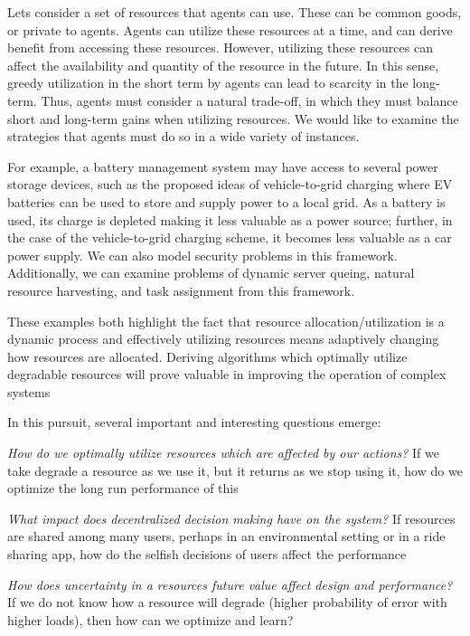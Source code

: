 \documentclass[letterpaper, 10 pt, conference]{ieeeconf}
\begin{document}
Lets consider a set of resources that agents can use. These can be common goods, or private to agents. Agents can utilize these resources at a time, and can derive benefit from accessing these resources. However, utilizing these resources can affect the availability and quantity of the resource in the future. In this sense, greedy utilization in the short term by agents can lead to scarcity in the long-term. Thus, agents must consider a natural trade-off, in which they must balance short and long-term gains when utilizing resources. We would like to examine the strategies that agents must do so in a wide variety of instances.

For example, a battery management system may have access to several power storage devices, such as the proposed ideas of vehicle-to-grid charging where EV batteries can be used to store and supply power to a local grid. As a battery is used, its charge is depleted making it less valuable as a power source; further, in the case of the vehicle-to-grid charging scheme, it becomes less valuable as a car power supply. We can also model security problems in this framework.  Additionally, we can examine problems of dynamic server queing, natural resource harvesting, and task assignment from this framework.

These examples both highlight the fact that resource allocation/utilization is a dynamic process and effectively utilizing resources means adaptively changing how resources are allocated. Deriving algorithms which optimally utilize degradable resources will prove valuable in improving the operation of complex systems

In this pursuit, several important  and interesting questions emerge:

\noindent\textit{How do we optimally utilize resources which are affected by our actions?} If we take degrade a resource as we use it, but it returns as we stop using it, how do we optimize the long run performance of this

\noindent\textit{What impact does decentralized decision making have on the system?} If resources are shared among many users, perhaps in an environmental setting or in a ride sharing app, how do the selfish decisions of users affect the performance

\noindent\textit{How does uncertainty in a resources future value affect design and performance?} If we do not know how a resource will degrade (higher probability of error with higher loads), then how can we optimize and learn?
\end{document}
